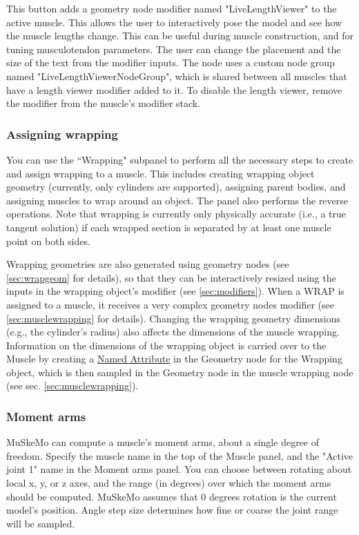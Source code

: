 \documentclass{article}
\begin{document}
This button adds a geometry node modifier named "LiveLengthViewer" to the active muscle. This allows the user to interactively pose the model and see how the muscle lengths change. This can be useful during muscle construction, and for tuning musculotendon parameters. The user can change the placement and the size of the text from the modifier inputs. %
The node uses a custom node group named "LiveLengthViewerNodeGroup", which is shared between all muscles that have a length viewer modifier added to it. To disable the length viewer, remove the modifier from the muscle's modifier stack.


\subsubsection{Assigning wrapping}

You can use the ``Wrapping" subpanel to perform all the necessary steps to create and assign wrapping to a muscle. This includes creating wrapping object geometry (currently, only cylinders are supported), assigning parent bodies, and assigning muscles to wrap around an object. The panel also performs the reverse operations. Note that wrapping is currently only physically accurate (i.e., a true tangent solution) if each wrapped section is separated by at least one muscle point on both sides.

Wrapping geometries are also generated using geometry nodes (see \ref{sec:wrapgeom} for details), so that they can be interactively resized using the inputs in the wrapping object's modifier (see \ref{sec:modifiers}). When a WRAP is assigned to a muscle, it receives a very complex geometry nodes modifier (see \ref{sec:musclewrapping} for details). Changing the wrapping geometry dimensions (e.g., the cylinder's radius) also affects the dimensions of the muscle wrapping. Information on the dimensions of the wrapping object is carried over to the Muscle by creating a \href{https://docs.blender.org/manual/en/latest/modeling/geometry_nodes/geometry/read/named_attribute.html}{Named Attribute} in the Geometry node for the Wrapping object, which is then sampled in the Geometry node in the muscle wrapping node (see sec. \ref{sec:musclewrapping}).



\subsubsection{Moment arms}

MuSkeMo can compute a muscle's moment arms, about a single degree of freedom. Specify the muscle name in the top of the Muscle panel, and the "Active joint 1"  name in the Moment arms panel. You can choose between rotating about local x, y, or z axes, and the range (in degrees) over which the moment arms should be computed. MuSkeMo assumes that 0 degrees rotation is the current model's position. Angle step size determines how fine or coarse the joint range will be sampled. 
\end{document}
